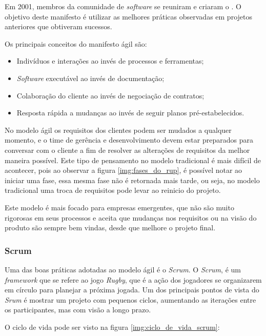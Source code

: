 Em 2001, membros da comunidade de \textit{software} se reuniram e criaram o \cite{agile_manifest}. O objetivo deste manifesto é utilizar as melhores práticas observadas em projetos anteriores que obtiveram sucessos.

Os principais conceitos do manifesto ágil são:

\begin{itemize}
	\item Indivíduos e interações ao invés de processos e ferramentas;
	\item \textit{Software} executável ao invés de documentação;
	\item Colaboração do cliente ao invés de negociação de contratos;
	\item Resposta rápida a mudanças ao invés de seguir planos pré-estabelecidos.
\end{itemize}

No modelo ágil os requisitos dos clientes podem ser mudados a qualquer momento, e o time de gerência e desenvolvimento devem estar preparados para conversar com o cliente a fim de resolver as alterações de requisitos da melhor maneira possível. Este tipo de pensamento no modelo tradicional é mais difícil de acontecer, pois ao observar a figura \ref{img:fases_do_rup}, é possível notar ao iniciar uma fase, essa mesma fase não é retornada mais tarde, ou seja, no modelo tradicional uma troca de requisitos pode levar ao reinicio do projeto.

Este modelo é mais focado para empresas emergentes, que não são muito rigorosas em seus processos e aceita que mudanças nos requisitos ou na visão do produto são sempre bem vindas, desde que melhore o projeto final.

\subsubsection{Scrum}
\label{sec:scrum}

Uma das boas práticas adotadas ao modelo ágil é o \textit{Scrum}. O \textit{Scrum}, é um \textit{framework} que se refere ao jogo \textit{Rugby}, que é a ação dos jogadores se organizarem em círculo para planejar a próxima jogada. Um dos principais pontos de vista do \textit{Srum} é mostrar um projeto com pequenos ciclos, aumentando as iterações entre os participantes, mas com visão a longo prazo.

O ciclo de vida pode ser visto na figura \ref{img:ciclo_de_vida_scrum}:

